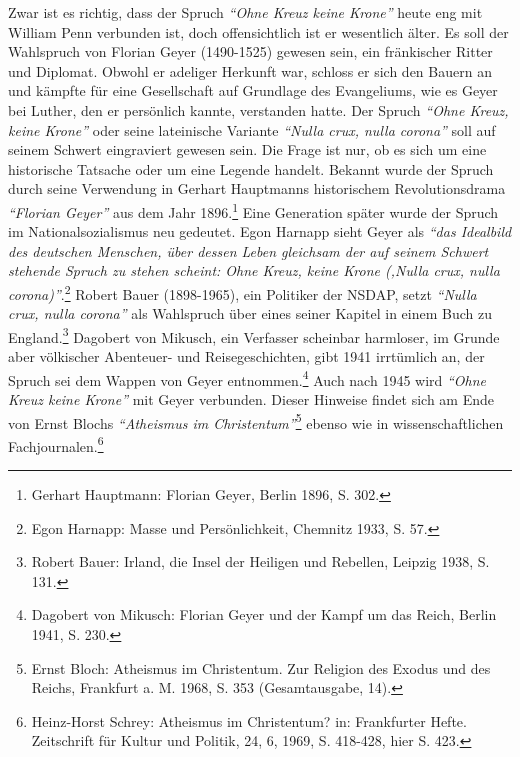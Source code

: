 Zwar ist es richtig, dass der Spruch \textit{"`Ohne Kreuz keine Krone"'} heute eng mit
William Penn verbunden ist, doch offensichtlich ist er wesentlich älter. Es soll
der Wahlspruch von Florian Geyer (1490-1525) gewesen sein, ein fränkischer
Ritter und Diplomat. Obwohl er adeliger Herkunft war, schloss er sich den Bauern
an und kämpfte für eine Gesellschaft auf Grundlage des Evangeliums, wie es Geyer
bei Luther, den er persönlich kannte, verstanden hatte. Der Spruch \textit{"`Ohne Kreuz,
keine Krone"'} oder seine lateinische Variante \textit{"`Nulla crux, nulla corona"'} soll
auf seinem Schwert eingraviert gewesen sein. Die Frage ist nur, ob es sich um
eine historische Tatsache oder um eine Legende handelt. Bekannt wurde der Spruch
durch seine Verwendung in Gerhart Hauptmanns historischem Revolutionsdrama
\textit{"`Florian Geyer"'} aus dem Jahr 1896.\footnote{Gerhart Hauptmann: Florian Geyer,
Berlin 1896, S. 302.} Eine Generation später wurde der Spruch im
Nationalsozialismus neu gedeutet. Egon Harnapp sieht Geyer als \textit{"`das Idealbild
des deutschen Menschen, über dessen Leben gleichsam der auf seinem Schwert
stehende Spruch zu stehen scheint: Ohne Kreuz, keine Krone (‚Nulla crux, nulla
corona)"'}.\footnote{Egon Harnapp: Masse und Persönlichkeit, Chemnitz 1933, S. 57.}
Robert Bauer (1898-1965), ein Politiker der NSDAP, setzt \textit{"`Nulla crux, nulla
corona"'} als Wahlspruch über eines seiner Kapitel in einem Buch zu England.\footnote{Robert Bauer:
Irland, die Insel der Heiligen und Rebellen, Leipzig 1938, S.
131.}
Dagobert von Mikusch, ein Verfasser scheinbar harmloser, im Grunde aber
völkischer Abenteuer- und Reisegeschichten, gibt 1941 irrtümlich an, der Spruch
sei dem Wappen von Geyer entnommen.\footnote{Dagobert von Mikusch: Florian Geyer
und der Kampf um das Reich, Berlin
1941, S. 230.} Auch nach 1945 wird \textit{"`Ohne Kreuz keine
Krone"'} mit Geyer verbunden. Dieser Hinweise findet sich am Ende von Ernst
Blochs \textit{"`Atheismus im Christentum"'}\footnote{Ernst Bloch: Atheismus im
Christentum. Zur Religion des Exodus und des
Reichs, Frankfurt a. M. 1968, S. 353 (Gesamtausgabe, 14).} ebenso wie in
wissenschaftlichen Fachjournalen.\footnote{Heinz-Horst Schrey: Atheismus im
Christentum? in: Frankfurter Hefte.
Zeitschrift für Kultur und Politik, 24, 6, 1969, S. 418-428, hier S. 423.}
